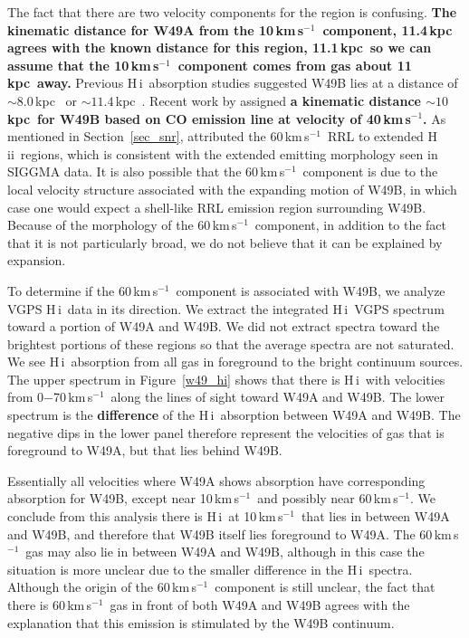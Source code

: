 \documentclass[manuscript]{aastex61}
\newcommand{\hii}{{\rm H\,}{{\sc ii}}}
\newcommand{\hi}{{\rm H\,}{{\sc i}}}
\newcommand{\kms}{\,km\,s$^{-1}$}
\newcommand{\kpc}{\,kpc}
\begin{document}
The fact that there are two velocity components for the region is confusing.
\textbf{The kinematic distance for W49A from the 10\kms\ component, 11.4\kpc\, agrees with the known distance for this region, 11.1\kpc\, so we can assume that the 10\kms\ component comes from gas about 11\kpc\ away.}
Previous \hi\ absorption studies suggested W49B lies at a distance of $\sim8.0$\kpc\ \citep{Moffett1994} or $\sim11.4$\kpc\ \citep{Brogan2001}.
Recent work by \citet{Zhu2014} assigned \textbf{a kinematic distance $\sim10$\kpc\ for W49B based on CO emission line at velocity of 40\kms.}
As mentioned in Section~\ref{sec_snr}, \citet{Pankonin1976} attributed the 60\kms\ RRL to extended \hii\ regions, which is consistent with the extended emitting morphology seen in SIGGMA data.
It is also possible that the 60\kms\ component is due to the local velocity structure associated with the expanding motion of W49B, in which case one would expect a shell-like RRL emission region surrounding W49B.
Because of the morphology of the 60\kms\ component, in addition to the fact that it is not particularly broad, we do not believe that it can be explained by expansion. 

To determine if the 60\kms\ component is associated with W49B, we analyze VGPS \hi\ data in its direction.  We extract the integrated \hi\ VGPS spectrum toward a portion of W49A and W49B.  We did not extract spectra toward the brightest portions of these regions so that the average spectra are not saturated.  We see \hi\ absorption from all gas in foreground to the bright continuum sources.
The upper spectrum in Figure~\ref{w49_hi} shows that there is \hi\ with velocities from 0$-$70\kms\ along the lines of sight toward W49A and W49B.
The lower spectrum is the \textbf{difference} of the \hi\ absorption between W49A and W49B.  The negative dips in the lower panel therefore represent the velocities of gas that is foreground to W49A, but that lies behind W49B.

Essentially all velocities where W49A shows absorption have corresponding absorption for W49B, except near 10\kms\ and possibly near 60\kms.
We conclude from this analysis there is \hi\ at 10\kms\ that lies in between W49A and W49B, and therefore that W49B itself lies foreground to W49A.
The 60\kms\ gas may also lie in between W49A and W49B, although in this case the situation is more unclear due to the smaller difference in the \hi\ spectra.
Although the origin of the 60\kms\ component is still unclear, the fact that there is 60\kms\ gas in front of both W49A and W49B agrees with the explanation that this emission is stimulated by the W49B continuum.
\end{document}
